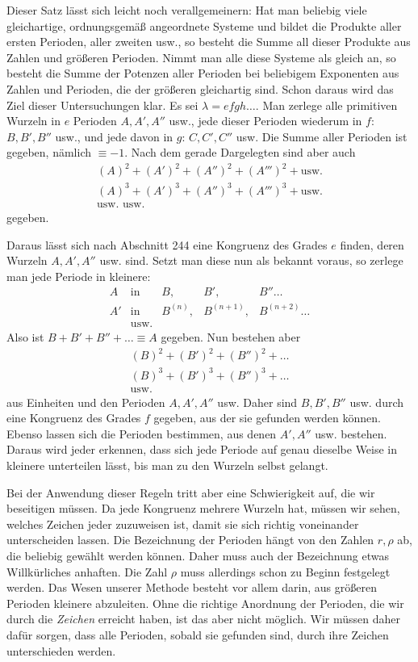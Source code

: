 Dieser Satz lässt sich leicht noch verallgemeinern: Hat man beliebig viele gleichartige, ordnungsgemäß angeordnete Systeme und bildet die Produkte aller ersten Perioden, aller zweiten usw., so besteht die Summe all dieser Produkte aus Zahlen und größeren Perioden. Nimmt man alle diese Systeme als gleich an, so besteht die Summe der Potenzen aller Perioden bei beliebigem Exponenten aus Zahlen und Perioden, die der größeren gleichartig sind. Schon daraus wird das Ziel dieser Untersuchungen klar. Es sei $\lambda=efgh\ldots$. Man zerlege alle primitiven Wurzeln in $e$ Perioden $A,A',A''$ usw., jede dieser Perioden wiederum in $f$: $B,B',B''$ usw., und jede davon in $g$: $C,C',C''$ usw. Die Summe aller Perioden ist gegeben, nämlich $\equiv-1$. Nach dem gerade Dargelegten sind aber auch
\[
\begin{gathered}
(A)^2+(A')^2+(A'')^2+(A''')^2+\text{usw.}\\
(A)^3+(A')^3+(A'')^3+(A''')^3+\text{usw.}\\
\text{usw. usw.}
\end{gathered}
\]
gegeben.

Daraus lässt sich nach Abschnitt 244 eine Kongruenz des Grades $e$ finden, deren Wurzeln $A,A',A''$ usw. sind. Setzt man diese nun als bekannt voraus, so zerlege man jede Periode in kleinere:
\[
\begin{array}{rclll}
A&\text{in}&B,&B',&B''\ldots\\
A'&\text{in}&B^{(n)},&B^{(n+1)},&B^{(n+2)}\ldots\\
&\text{usw.}
\end{array}
\]
Also ist $B+B'+B''+\ldots\equiv A$ gegeben. Nun bestehen aber
\[
\begin{gathered}
(B)^2+(B')^2+(B'')^2+\ldots\\
(B)^3+(B')^3+(B'')^3+\ldots\\
\text{usw.}
\end{gathered}
\]
aus Einheiten und den Perioden $A,A',A''$ usw. Daher sind $B,B',B''$ usw. durch eine Kongruenz des Grades $f$ gegeben, aus der sie gefunden werden können. Ebenso lassen sich die Perioden bestimmen, aus denen $A',A''$ usw. bestehen. Daraus wird jeder erkennen, dass sich jede Periode auf genau dieselbe Weise in kleinere unterteilen lässt, bis man zu den Wurzeln selbst gelangt.

Bei der Anwendung dieser Regeln tritt aber eine Schwierigkeit auf, die wir beseitigen müssen. Da jede Kongruenz mehrere Wurzeln hat, müssen wir sehen, welches Zeichen jeder zuzuweisen ist, damit sie sich richtig voneinander unterscheiden lassen. Die Bezeichnung der Perioden hängt von den Zahlen $r,\rho$ ab, die beliebig gewählt werden können. Daher muss auch der Bezeichnung etwas Willkürliches anhaften. Die Zahl $\rho$ muss allerdings schon zu Beginn festgelegt werden. Das Wesen unserer Methode besteht vor allem darin, aus größeren Perioden kleinere abzuleiten. Ohne die richtige Anordnung der Perioden, die wir durch die \emph{Zeichen} erreicht haben, ist das aber nicht möglich. Wir müssen daher dafür sorgen, dass alle Perioden, sobald sie gefunden sind, durch ihre Zeichen unterschieden werden.

